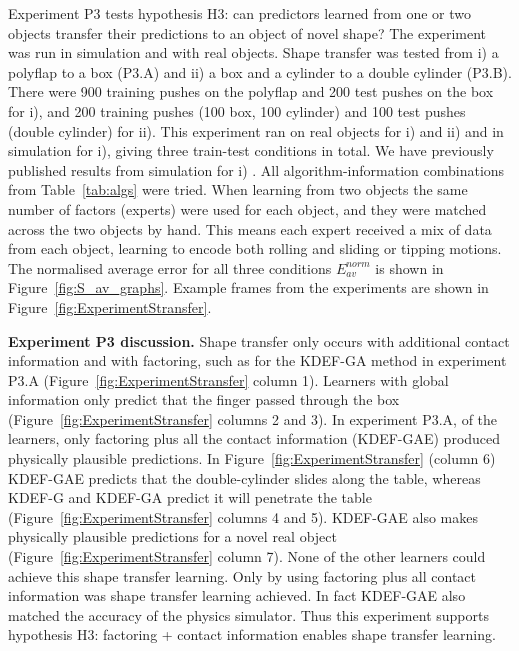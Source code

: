 Experiment P3 tests hypothesis H3: can predictors learned from one or two objects transfer their predictions to an object of novel shape? The experiment was run in simulation and with real objects. Shape transfer was tested from i) a polyflap to a box (P3.A) and ii) a box and a cylinder to a double cylinder (P3.B). There were 900 training pushes on the polyflap and 200 test pushes on the box for i), and 200 training pushes (100 box, 100 cylinder) and 100 test pushes (double cylinder) for ii). This experiment ran on real objects for i) and ii) and in simulation for i), giving three train-test conditions in total. We have previously published results from simulation for i) \cite{kopicki-etal-icra11}. All algorithm-information combinations from Table~\ref{tab:algs} were tried. When learning from two objects the same number of factors (experts) were used for each object, and they were matched across the two objects by hand. This means each expert received a mix of data from each object, learning to encode both rolling and sliding or tipping motions.  The normalised average error for all three conditions $E_{av}^{norm}$ is shown in Figure~\ref{fig:S_av_graphs}. Example frames from the experiments are shown in Figure~\ref{fig:ExperimentStransfer}.

{\bf Experiment P3 discussion.} Shape transfer only occurs with additional contact information and with factoring, such as for the
KDEF-GA method in experiment P3.A (Figure~\ref{fig:ExperimentStransfer} column 1).  Learners with global information only predict that the finger passed  through the box (Figure~\ref{fig:ExperimentStransfer} columns 2 and 3). In experiment P3.A, of the learners, only factoring plus all the contact information (KDEF-GAE) produced physically plausible predictions. In Figure~\ref{fig:ExperimentStransfer} (column 6) KDEF-GAE predicts that the double-cylinder slides along the table, whereas KDEF-G and KDEF-GA predict it will penetrate the table (Figure~\ref{fig:ExperimentStransfer} columns 4 and 5). KDEF-GAE also makes physically plausible predictions for a novel real object 
(Figure~\ref{fig:ExperimentStransfer} column 7). None of the other learners could achieve this shape transfer learning. Only by using factoring plus all contact information was shape transfer learning achieved. In fact KDEF-GAE also matched the accuracy of the physics simulator. Thus this experiment supports hypothesis H3: factoring + contact information enables shape transfer learning.


